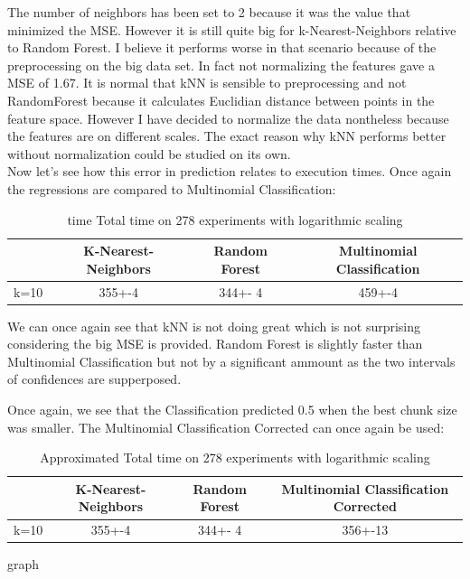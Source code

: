 \documentclass[12pt]{article}
\begin{document}
The number of neighbors has been set to 2 because it was the value that minimized the MSE. However it is still quite big for k-Nearest-Neighbors relative to Random Forest. I believe it performs worse in that scenario because of the preprocessing on the big data set. In fact not normalizing the features gave a MSE of 1.67. It is normal that kNN is sensible to preprocessing and not RandomForest because it calculates Euclidian distance between points in the feature space. However I have decided to normalize the data nontheless because the features are on different scales. The exact reason why kNN performs better without normalization could be studied on its own.
\\

Now let's see how this error in prediction relates to execution times. Once again the regressions are compared to Multinomial Classification:

\begin{table}[h]
	\centering
	\caption{ time Total time on 278 experiments with logarithmic scaling}
	\label{my-label}
	\begin{tabular}{|c|c|c|c|}
		\hline
		& K-Nearest-Neighbors & Random Forest &Multinomial Classification\\ \hline
		k=10  & 355+-4        & 344+- 4&459+-4 \\ \hline
	\end{tabular}
\end{table}

We can once again see that kNN is not doing great which is not surprising considering the big MSE is provided. Random Forest is slightly faster than Multinomial Classification but not by a significant ammount as the two intervals of confidences are supperposed.


Once again, we see that the Classification predicted 0.5 when the best chunk size was smaller. The Multinomial Classification Corrected can once again be used:

\begin{table}[h]
	\centering
	\caption{Approximated Total time on 278 experiments with logarithmic scaling}
	\label{my-label}
	\begin{tabular}{|c|c|c|c|}
		\hline
		& K-Nearest-Neighbors & Random Forest &Multinomial Classification Corrected\\ \hline
		k=10  & 355+-4        & 344+- 4&356+-13 \\ \hline
	\end{tabular}
\end{table}
graph
\end{document}
